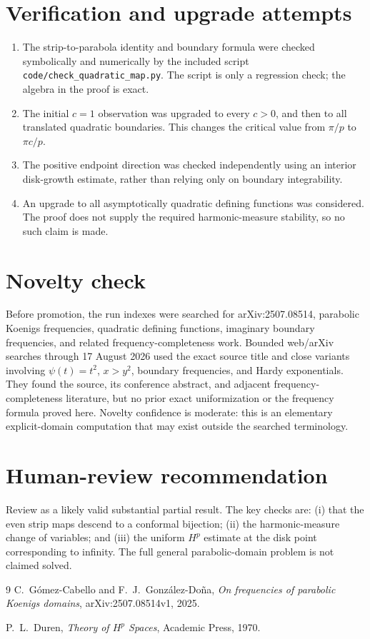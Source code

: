 \documentclass[11pt]{article}
\begin{document}
\section*{Verification and upgrade attempts}

\begin{enumerate}[leftmargin=2em]
\item The strip-to-parabola identity and boundary formula were checked
symbolically and numerically by the included script
\texttt{code/check\_quadratic\_map.py}.  The script is only a regression
check; the algebra in the proof is exact.
\item The initial \(c=1\) observation was upgraded to every \(c>0\), and then
to all translated quadratic boundaries.  This changes the critical value
from \(\pi/p\) to \(\pi c/p\).
\item The positive endpoint direction was checked independently using an
interior disk-growth estimate, rather than relying only on boundary
integrability.
\item An upgrade to all asymptotically quadratic defining functions was
considered.  The proof does not supply the required harmonic-measure
stability, so no such claim is made.
\end{enumerate}

\section*{Novelty check}

Before promotion, the run indexes were searched for arXiv:2507.08514,
parabolic Koenigs frequencies, quadratic defining functions, imaginary
boundary frequencies, and related frequency-completeness work.
Bounded web/arXiv searches through 17 August 2026 used the exact source title
and close variants involving \(\psi(t)=t^2\), \(x>y^2\), boundary
frequencies, and Hardy exponentials.  They found the source, its conference
abstract, and adjacent frequency-completeness literature, but no prior exact
uniformization or the frequency formula proved here.  Novelty confidence is
moderate: this is an elementary explicit-domain computation that may exist
outside the searched terminology.

\section*{Human-review recommendation}

Review as a likely valid substantial partial result.  The key checks are:
(i) that the even strip maps descend to a conformal bijection;
(ii) the harmonic-measure change of variables; and
(iii) the uniform \(H^p\) estimate at the disk point corresponding to
infinity.  The full general parabolic-domain problem is not claimed solved.

\begin{thebibliography}{9}
C.~G\'omez-Cabello and F.~J.~Gonz\'alez-Do\~na,
\emph{On frequencies of parabolic Koenigs domains},
arXiv:2507.08514v1, 2025.

P.~L.~Duren, \emph{Theory of \(H^p\) Spaces},
Academic Press, 1970.
\end{thebibliography}
\end{document}
